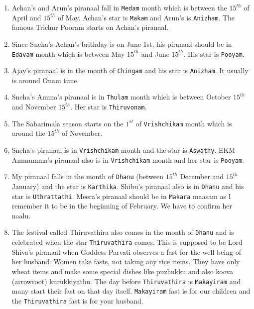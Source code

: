 \documentclass[10pt,twoside]{article}
\begin{document}
\begin{enumerate}
\item Achan's and Arun's piranaal fall in \verb|Medam| month which is between the $15^{th}$ of April and $15^{th}$ of May. Achan's star is \verb|Makam| and Arun's is \verb|Anizham|. The famous Trichur Pooram starts on Achan's piranaal.
\item Since Sneha's Achan's brithday is on June 1st, his piranaal should be in \verb|Edavam| month which is between May $15^{th}$ and June $15^{th}$. His star is \verb|Pooyam|.
\item Ajay's piranaal is in the month of \verb|Chingam| and his star is \verb|Anizham|. It usually is around Onam time. 
\item Sneha's Amma's piranaal is in \verb|Thulam| month which is between October $15^{th}$ and November $15^{th}$. Her star is \verb|Thiruvonam|.
\item The Sabarimala season starts on the $1^{st}$ of \verb|Vrishchikam| month which is around the $15^{th}$ of November.
\item Sneha's piranaal is in \verb|Vrishchikam| month and the star is \verb|Aswathy|. EKM Ammumma's piranaal also is in \verb|Vrishchikam| month and her star is \verb|Pooyam|.
\item My piranaal falls in the month of \verb|Dhanu| (between $15^{th}$ December and $15^{th}$ January) and the star is \verb|Karthika|. Shibu's piranaal also is in \verb|Dhanu| and his star is \verb|Uthrattathi|. Meera's piranaal should be in \verb|Makara| maasam as I remember it to be in the beginning of February. We have to confirm her naalu.
\item The festival called Thiruvathira also comes in the month of \verb|Dhanu| and is celebrated when the star \verb|Thiruvathira| comes. This is supposed to be Lord Shiva's piranaal when Goddess Parvati observes a fast for the well being of her husband. Women take fasts, not taking any rice items. They have only wheat items and make some special dishes like puzhukku and also koova (arrowroot) kurukkiyathu. The day before \verb|Thiruvathira| is \verb|Makayiram| and many start their fast on that day itself. \verb|Makayiram| fast is for our children and the \verb|Thiruvathira| fast is for your husband.
\end{enumerate}
\end{document}
